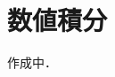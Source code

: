 \documentclass[../../main]{subfiles}
\begin{document}
\chapter{数値積分}
\label{chapter:numerical_differentiation}
\begin{lead}
作成中．
\end{lead}
\end{document}
